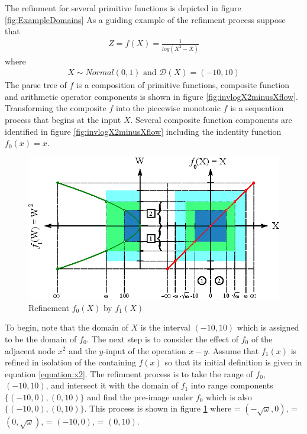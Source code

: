 The refinment for several primitive functions is depicted in figure \ref{fig:ExampleDomains}  As a guiding example of the refinment process suppose that
\begin{align*}
Z = f(X) = \frac{1}{log(X^2 - X)}
\end{align*}
where
\begin{align*}
X \sim Normal(0,1) \text{ and } \mathcal{D}(X) = (-10,10)
\end{align*}
The parse tree of $f$ is a composition of primitive functions, composite function and arithmetic operator components is shown in figure \ref{fig:invlogX2minusXflow}. Transforming the composite $f$ into the piecewise monotonic $f$ is a sequention process that begins at the input $X$. Several composite function components are identified in figure \ref{fig:invlogX2minusXflow} including the indentity function $f_0(x) = x$. 

\begin{figure}
  \centering
  \includegraphics{Images/X.eps}
  \caption[Refinement $f_0(X)$ by $f_1(X)$]
          {Refinement $f_0(X)$ by $f_1(X)$}
  \label{fig:X}
\end{figure}

To begin, note that the domain of $X$ is the interval $(-10,10)$ which is assigned to be the domain of $f_0$. The next step is to consider the effect of $f_0$ of the adjacent node $x^2$ and the $y$-input of the operation $x-y$. Assume that $f_1(x)$ is refined in isolation of the containing $f(x)$ so that its initial definition is given in equation \ref{equation:x2}. The refinment process is to take the range of $f_0$, $(-10,10)$, and intersect it with the domain of $f_1$ into range components $\{(-10,0), (0,10)\}$ and find the pre-image under $f_0$ which is also $\{(-10,0), (0,10)\}$. This process is shown in figure \ref{fig:X} where  = $(-\sqrt{\omega}, 0)$,  = $(0, \sqrt{\omega})$,  = $(-10,0)$,  = $(0,10)$. 

